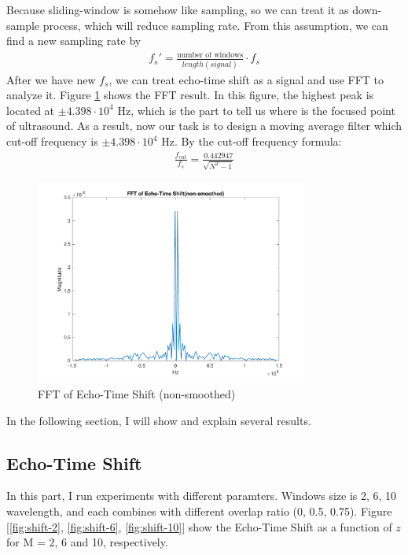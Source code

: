 \documentclass{article}
\begin{document}
Because sliding-window is somehow like sampling, so we can treat it as down-sample process, which will reduce sampling rate.
From this assumption, we can find a new sampling rate by
\begin{align*}
    f_s' = \frac{\text{number of windows}}{length(signal)} \cdot f_s
\end{align*}
After we have new $f_s$, we can treat echo-time shift as a signal and use FFT to analyze it. Figure \ref{fig:fft-non} shows the
FFT result. In this figure, the highest peak is located at $\pm 4.398 \cdot 10^4$ Hz, which is the part to tell us where
is the focused point of ultrasound. As a result, now our task is to design a moving average filter which cut-off frequency
is $\pm 4.398 \cdot 10^4$ Hz. By the cut-off frequency formula:
\begin{align*}
    \frac{f_{cut}}{f_s} = \frac{0.442947}{\sqrt{N^2 - 1}}
\end{align*}
\begin{figure}[H]
    \centering
    \includegraphics[width=0.8\textwidth]{src/fft_non.pdf}
    \caption{FFT of Echo-Time Shift (non-smoothed)}
    \label{fig:fft-non}
\end{figure}


In the following section, I will show and explain several results.
\subsection{Echo-Time Shift}
In this part, I run experiments with different paramters. Windows size is 2, 6, 10 wavelength, and each combines with different 
overlap ratio (0, 0.5, 0.75). Figure [\ref{fig:shift-2}, \ref{fig:shift-6}, \ref{fig:shift-10}] show the Echo-Time Shift
as a function of $z$ for M = 2, 6 and 10, respectively.
\end{document}
